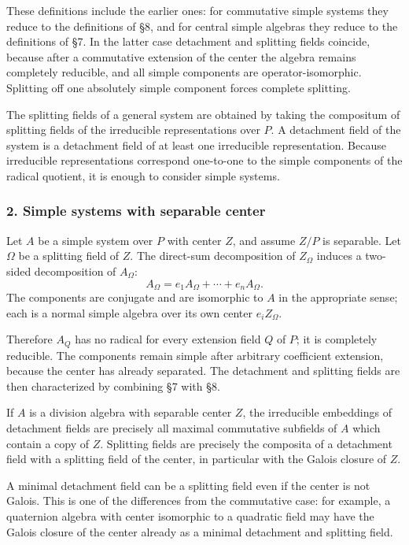 \documentclass[11pt]{article}
\begin{document}
These definitions include the earlier ones: for commutative simple
systems they reduce to the definitions of §8, and for central simple
algebras they reduce to the definitions of §7. In the latter case
detachment and splitting fields coincide, because after a commutative
extension of the center the algebra remains completely reducible, and
all simple components are operator-isomorphic. Splitting off one
absolutely simple component forces complete splitting.

The splitting fields of a general system are obtained by taking the
compositum of splitting fields of the irreducible representations over
\(P\). A detachment field of the system is a detachment field of at
least one irreducible representation. Because irreducible
representations correspond one-to-one to the simple components of the
radical quotient, it is enough to consider simple systems.

\subsubsection{2. Simple systems with separable
center}\label{simple-systems-with-separable-center}

Let \(A\) be a simple system over \(P\) with center \(Z\), and assume
\(Z/P\) is separable. Let \(\Omega\) be a splitting field of \(Z\). The
direct-sum decomposition of \(Z_\Omega\) induces a two-sided
decomposition of \(A_\Omega\): \[
  A_\Omega=e_1A_\Omega+\cdots+e_nA_\Omega.
\] The components are conjugate and are isomorphic to \(A\) in the
appropriate sense; each is a normal simple algebra over its own center
\(e_iZ_\Omega\).

Therefore \(A_Q\) has no radical for every extension field \(Q\) of
\(P\); it is completely reducible. The components remain simple after
arbitrary coefficient extension, because the center has already
separated. The detachment and splitting fields are then characterized by
combining §7 with §8.

If \(A\) is a division algebra with separable center \(Z\), the
irreducible embeddings of detachment fields are precisely all maximal
commutative subfields of \(A\) which contain a copy of \(Z\). Splitting
fields are precisely the composita of a detachment field with a
splitting field of the center, in particular with the Galois closure of
\(Z\).

A minimal detachment field can be a splitting field even if the center
is not Galois. This is one of the differences from the commutative case:
for example, a quaternion algebra with center isomorphic to a quadratic
field may have the Galois closure of the center already as a minimal
detachment and splitting field.
\end{document}
